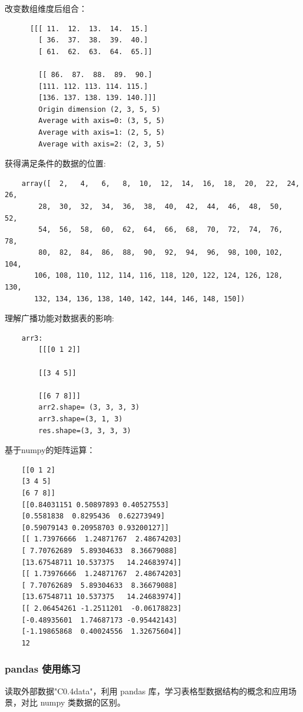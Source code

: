 \documentclass[10pt,a4paper,twoside,UTF8]{ctexart}
\begin{document}
改变数组维度后组合：
\begin{lstlisting}
	  [[[ 11.  12.  13.  14.  15.]
		[ 36.  37.  38.  39.  40.]
		[ 61.  62.  63.  64.  65.]]

		[[ 86.  87.  88.  89.  90.]
		[111. 112. 113. 114. 115.]
		[136. 137. 138. 139. 140.]]]
		Origin dimension (2, 3, 5, 5)
		Average with axis=0: (3, 5, 5)
		Average with axis=1: (2, 5, 5)
		Average with axis=2: (2, 3, 5)
\end{lstlisting}

获得满足条件的数据的位置:
\begin{lstlisting}
	array([  2,   4,   6,   8,  10,  12,  14,  16,  18,  20,  22,  24,  26,
        28,  30,  32,  34,  36,  38,  40,  42,  44,  46,  48,  50,  52,
        54,  56,  58,  60,  62,  64,  66,  68,  70,  72,  74,  76,  78,
        80,  82,  84,  86,  88,  90,  92,  94,  96,  98, 100, 102, 104,
       106, 108, 110, 112, 114, 116, 118, 120, 122, 124, 126, 128, 130,
       132, 134, 136, 138, 140, 142, 144, 146, 148, 150])
\end{lstlisting}

理解广播功能对数据表的影响:
\begin{lstlisting}
	arr3: 
		[[[0 1 2]]

		[[3 4 5]]

		[[6 7 8]]]
		arr2.shape= (3, 3, 3, 3)
		arr3.shape=(3, 1, 3)
		res.shape=(3, 3, 3, 3)
\end{lstlisting}

基于numpy的矩阵运算：
\begin{lstlisting}
	[[0 1 2]
	[3 4 5]
	[6 7 8]]
	[[0.84031151 0.50897893 0.40527553]
	[0.5581838  0.8295436  0.62273949]
	[0.59079143 0.20958703 0.93200127]]
	[[ 1.73976666  1.24871767  2.48674203]
	[ 7.70762689  5.89304633  8.36679088]
	[13.67548711 10.537375   14.24683974]]
	[[ 1.73976666  1.24871767  2.48674203]
	[ 7.70762689  5.89304633  8.36679088]
	[13.67548711 10.537375   14.24683974]]
	[[ 2.06454261 -1.2511201  -0.06178823]
	[-0.48935601  1.74687173 -0.95442143]
	[-1.19865868  0.40024556  1.32675604]]
	12
\end{lstlisting}

\subsubsection{pandas 使用练习}
读取外部数据"C0.4data"，利用 pandas 库，学习表格型数据结构的概念和应用场景，对比 numpy 类数据的区别。
\end{document}
